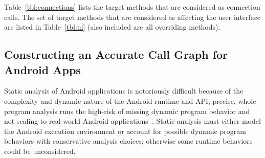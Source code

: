 Table~\ref{tbl:connections} lists the target methods that are considered as
connection calls.  The set of target methods that are considered as
affecting the user interface are listed in Table~\ref{tbl:ui} (also
included are all overriding methods).







\subsection{Constructing an Accurate Call Graph for Android Apps }

Static analysis of Android applications is notoriously difficult
because of the complexity and dynamic nature of the Android runtime
and API; precise, whole-program analysis runs the high-risk of missing
dynamic program behavior and not scaling to real-world Android
applications~\cite{Gordon:Kim:Perkins:Gilham:Nguyen:Rinard:NDSS15}.
Static analysis must either model the Android execution
environment or account for possible dynamic program behaviors with
conservative analysis choices; otherwise some runtime behaviors could
be unconsidered.  

